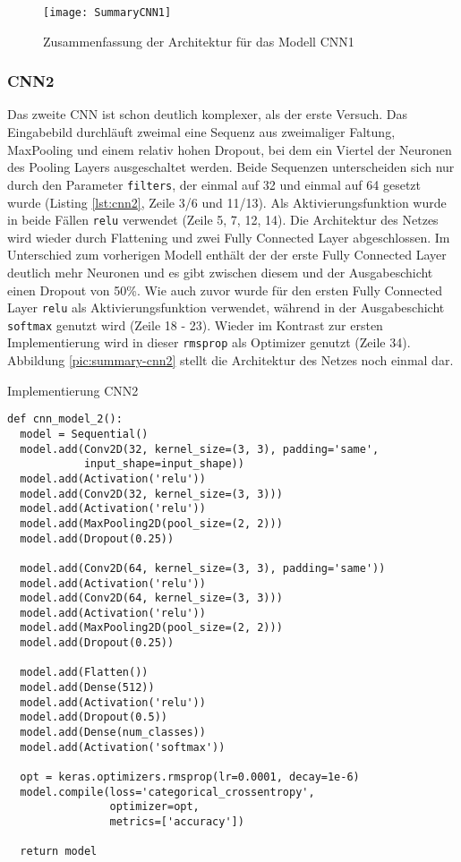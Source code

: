 \begin{figure} [H]
	\centering
	\texttt{[image: SummaryCNN1]}
	\caption{Zusammenfassung der Architektur für das Modell CNN1}
	\label{pic:summary-cnn1}
\end{figure}

\subsubsection{CNN2}
Das zweite CNN ist schon deutlich komplexer, als der erste Versuch. Das Eingabebild durchläuft zweimal eine Sequenz aus zweimaliger Faltung, MaxPooling und einem relativ hohen Dropout, bei dem ein Viertel der Neuronen des Pooling Layers ausgeschaltet werden. Beide Sequenzen unterscheiden sich nur durch den Parameter \texttt{filters}, der einmal auf 32 und einmal auf 64 gesetzt wurde (Listing \ref{lst:cnn2}, Zeile 3/6 und 11/13). Als Aktivierungsfunktion wurde in beide Fällen \texttt{relu} verwendet (Zeile 5, 7, 12, 14).
Die Architektur des  Netzes wird wieder durch Flattening und zwei Fully Connected Layer abgeschlossen. Im Unterschied zum vorherigen Modell enthält der der erste Fully Connected Layer deutlich mehr Neuronen und es gibt zwischen diesem und der Ausgabeschicht einen Dropout von 50\%. Wie auch zuvor wurde für den ersten Fully Connected Layer \texttt{relu} als Aktivierungsfunktion verwendet, während in der Ausgabeschicht \texttt{softmax} genutzt wird (Zeile 18 - 23). Wieder im Kontrast zur ersten Implementierung wird in dieser \texttt{rmsprop} als Optimizer genutzt (Zeile 34). Abbildung \ref{pic:summary-cnn2} stellt die Architektur des Netzes noch einmal dar.

\begin{listing} [H]
	\caption{Implementierung CNN2}
	\label{lst:cnn2}
	\begin{verbatim}
def cnn_model_2():
  model = Sequential()
  model.add(Conv2D(32, kernel_size=(3, 3), padding='same',
            input_shape=input_shape))
  model.add(Activation('relu'))
  model.add(Conv2D(32, kernel_size=(3, 3)))
  model.add(Activation('relu'))
  model.add(MaxPooling2D(pool_size=(2, 2)))
  model.add(Dropout(0.25))

  model.add(Conv2D(64, kernel_size=(3, 3), padding='same'))
  model.add(Activation('relu'))
  model.add(Conv2D(64, kernel_size=(3, 3)))
  model.add(Activation('relu'))
  model.add(MaxPooling2D(pool_size=(2, 2)))
  model.add(Dropout(0.25))

  model.add(Flatten())
  model.add(Dense(512))
  model.add(Activation('relu'))
  model.add(Dropout(0.5))
  model.add(Dense(num_classes))
  model.add(Activation('softmax'))

  opt = keras.optimizers.rmsprop(lr=0.0001, decay=1e-6)
  model.compile(loss='categorical_crossentropy', 
                optimizer=opt,
                metrics=['accuracy'])

  return model
	\end{verbatim}
\end{listing} 

